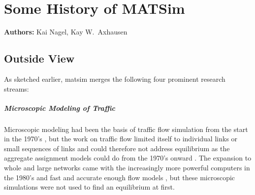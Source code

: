 \chapter{Some History of MATSim}
\label{ch:history}

\hfill \textbf{Authors:} Kai Nagel, Kay W.\ Axhausen


%
%


\section{Outside View}
\label{sec:streams}
As sketched earlier, \gls{matsim} merges the following four prominent research streams:

\paragraph{Microscopic Modeling of Traffic} 
Microscopic modeling had been the basis of traffic flow simulation from the start in the 1970’s \citep[e.g.,][]{Wiedemann_PhDThesis_1974, Seddon_Simulation_1972}, but the work on traffic flow limited itself to individual links or small sequences of links and could therefore not address equilibrium as the aggregate assignment models could do from the 1970’s onward \citep[see][]{OrtuzarWillumsen_2011}. The expansion to whole and large networks came with the increasingly more powerful computers in the 1980’s and fast and accurate enough flow models \citep[e.g.,][]{Schwerdtfeger_VolmulerHamerslag_1984, NagelSchreckenberg1992CA, Daganzo_TransResPartB_1994}, but these 
microscopic simulations were not used to find an \gls{equilibrium} at first. 

